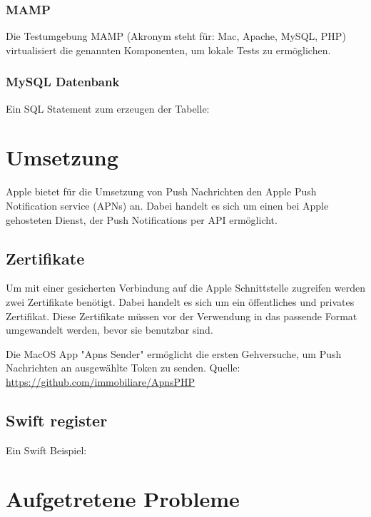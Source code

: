 \subsubsection{MAMP}
Die Testumgebung MAMP (Akronym steht für: Mac, Apache, MySQL, PHP) virtualisiert die genannten Komponenten, um lokale Tests zu ermöglichen.

\subsubsection{MySQL Datenbank}

Ein SQL Statement zum erzeugen der Tabelle:






\section{Umsetzung}

Apple bietet für die Umsetzung von Push Nachrichten den Apple Push Notification service (APNs) an. Dabei handelt es sich um einen bei Apple gehosteten Dienst, der Push Notifications per API ermöglicht.


\subsection{Zertifikate}
Um mit einer gesicherten Verbindung auf die Apple Schnittstelle zugreifen werden zwei Zertifikate benötigt. Dabei handelt es sich um ein öffentliches und privates Zertifikat. Diese Zertifikate müssen vor der Verwendung in das passende Format umgewandelt werden, bevor sie benutzbar sind.

Die MacOS App "Apns Sender" ermöglicht die ersten Gehversuche, um Push Nachrichten an ausgewählte Token zu senden.
Quelle: \url{https://github.com/immobiliare/ApnsPHP}



\subsection{Swift register}
Ein Swift Beispiel:



\section{Aufgetretene Probleme}


